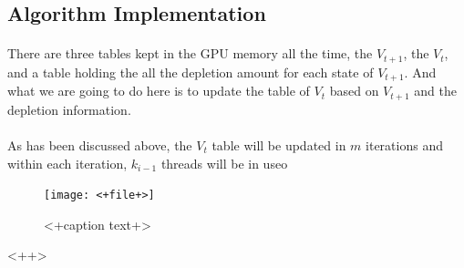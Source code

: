 \documentclass[11pt,reqno]{article}
\begin{document}
\subsection*{Algorithm Implementation}
\paragraph{} There are three tables kept in the GPU memory all the time, the $V_{t + 1}$, the $V_{t}$, and a table holding the all the depletion amount for each state of $V_{t + 1}$. And what we are going to do here is to update the table of $V_{t}$ based on $V_{t + 1}$ and the depletion information.
\paragraph{} As has been discussed above, the $V_{t}$ table will be updated in $m$ iterations and within each iteration, $k_{i - 1}$ threads will be in useo

\begin{figure}[c]
        \centering
        \texttt{[image: <+file+>]}
        \caption{<+caption text+>}
        \label{fig:<+label+>}
\end{figure}<++>

 
\end{document}
